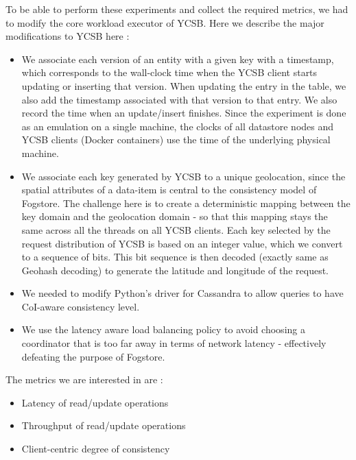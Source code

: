 \par To be able to perform these experiments and collect the required metrics, we had to modify the core workload executor of YCSB. Here we describe the major modifications to YCSB here :
\begin{itemize}
\item We associate each version of an entity with a given key with a timestamp, which corresponds to the wall-clock time when the YCSB client starts updating or inserting that version. When updating the entry in the table, we also add the timestamp associated with that version to that entry. We also record the time when an update/insert finishes. Since the experiment is done as an emulation on a single machine, the clocks of all datastore nodes and YCSB clients (Docker containers) use the time of the underlying physical machine.
\item We associate each key generated by YCSB to a unique geolocation, since the spatial attributes of a data-item is central to the consistency model of Fogstore. The challenge here is to create a deterministic mapping between the key domain and the geolocation domain - so that this mapping stays the same across all the threads on all YCSB clients. Each key selected by the request distribution of YCSB is based on an integer value, which we convert to a sequence of bits. This bit sequence is then decoded (exactly same as Geohash decoding) to generate the latitude and longitude of the request.
\item We needed to modify Python's driver for Cassandra to allow queries to have CoI-aware consistency level.
\item We use the latency aware load balancing policy to avoid choosing a coordinator that is too far away in terms of network latency - effectively defeating the purpose of Fogstore.
\end{itemize}

\par The metrics we are interested in are :
\begin{itemize}
\item Latency of read/update operations
\item Throughput of read/update operations
\item Client-centric degree of consistency
\end{itemize}

